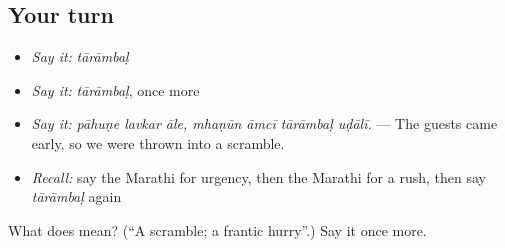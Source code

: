 \subsection*{Your turn}
\begin{itemize}
\raggedright
  \item \emph{Say it:} \emph{tārāmbaḷ}
  \item \emph{Say it:} \emph{tārāmbaḷ}, once more
  \item \emph{Say it:} \emph{pāhuṇe lavkar āle, mhaṇūn āmcī tārāmbaḷ uḍālī.} — The guests came early, so we were thrown into a scramble.
  \item \emph{Recall:} say the Marathi for urgency, then the Marathi for a rush, then say \emph{tārāmbaḷ} again
\end{itemize}

\begin{tcolorbox}[breakable,colback=teal!4,colframe=teal!35!black,title={Before you move on}]
What does  mean? (\textquotedblleft{}A scramble; a frantic hurry\textquotedblright{}.) Say it once more.
\end{tcolorbox}
